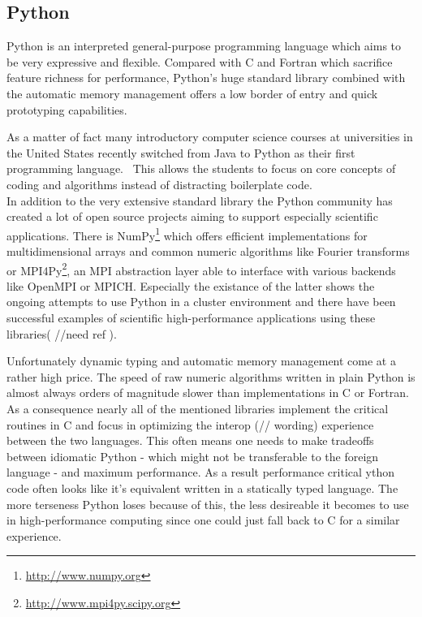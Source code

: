 \subsection*{Python}
\label{subsec:State_of_the_art::Candidates::Python}

Python is an interpreted general-purpose programming language which aims to be very expressive and flexible. Compared with C and Fortran which sacrifice feature richness for performance, Python's huge standard library combined with the automatic memory management offers a low border of entry and quick prototyping capabilities.

As a matter of fact many introductory computer science courses at universities in the United States recently switched from Java to Python as their first programming language.~\cite{GUO14, intro_py} This allows the students to focus on core concepts of coding and algorithms instead of distracting boilerplate code.
\\


In addition to the very extensive standard library the Python community has created a lot of open source projects aiming to support especially scientific applications. There is NumPy\footnote{\url{http://www.numpy.org}} which offers efficient implementations for multidimensional arrays and common numeric algorithms like Fourier transforms or MPI4Py\footnote{\url{http://www.mpi4py.scipy.org}}, an MPI abstraction layer able to interface with various backends like OpenMPI or MPICH. Especially the existance of the latter shows the ongoing attempts to use Python in a cluster environment and there have been successful examples of scientific high-performance applications using these libraries( //need ref ).

Unfortunately dynamic typing and automatic memory management come at a rather high price. The speed of raw numeric algorithms written in plain Python is almost always orders of magnitude slower than implementations in C or Fortran. As a consequence nearly all of the mentioned libraries implement the critical routines in C and focus in optimizing the interop (// wording) experience between the two languages. This often means one needs to make tradeoffs between idiomatic Python - which might not be transferable to the foreign language - and maximum performance. As a result performance critical ython code often looks like it's equivalent written in a statically typed language. The more terseness Python loses because of this, the less desireable it becomes to use in high-performance computing since one could just fall back to C for a similar experience.


